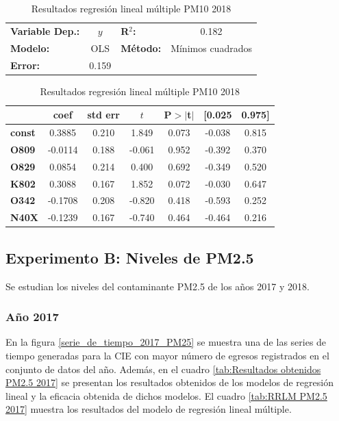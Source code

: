 \begin{table}[hbt!]
\caption{Resultados regresión lineal múltiple PM10 2018}
\label{tab:RRLM PM10 2018}
\begin{center}
\begin{tabular}{lclc}
\toprule
\textbf{Variable Dep.:}    &        $y$         & \textbf{  R$^2$:         } &     0.182   \\
\textbf{Modelo:}            &       OLS        & \textbf{Método:}           &  Mínimos cuadrados  \\
\textbf{Error:}            & 0.159  \\
\bottomrule
\end{tabular}
\begin{tabular}{lcccccc}
               & \textbf{coef} & \textbf{std err} & \textbf{$t$} & \textbf{P$> |$t$|$} & \textbf{[0.025} & \textbf{0.975]}  \\
\midrule
\textbf{const} &       0.3885  &        0.210     &     1.849  &         0.073        &       -0.038    &        0.815     \\
\textbf{O809}  &      -0.0114  &        0.188     &    -0.061  &         0.952        &       -0.392    &        0.370     \\
\textbf{O829}  &       0.0854  &        0.214     &     0.400  &         0.692        &       -0.349    &        0.520     \\
\textbf{K802}  &       0.3088  &        0.167     &     1.852  &         0.072        &       -0.030    &        0.647     \\
\textbf{O342}  &      -0.1708  &        0.208     &    -0.820  &         0.418        &       -0.593    &        0.252     \\
\textbf{N40X}  &      -0.1239  &        0.167     &    -0.740  &         0.464        &       -0.464    &        0.216     \\
\bottomrule
\end{tabular}
\end{center}
\end{table}


\clearpage
\subsection{Experimento B: Niveles de PM2.5}
Se estudian los niveles del contaminante PM2.5 de los años 2017 y 2018.

\subsubsection{Año 2017}
En la figura \ref{serie_de_tiempo_2017_PM25} se muestra una de las series de tiempo generadas para la CIE con mayor número de egresos registrados en el conjunto de datos del año. Además, en el cuadro \ref{tab:Resultados obtenidos PM2.5 2017} se presentan los resultados obtenidos de los modelos de regresión lineal y la eficacia obtenida de dichos modelos. El cuadro \ref{tab:RRLM PM2.5 2017} muestra los resultados del modelo de regresión lineal múltiple.

